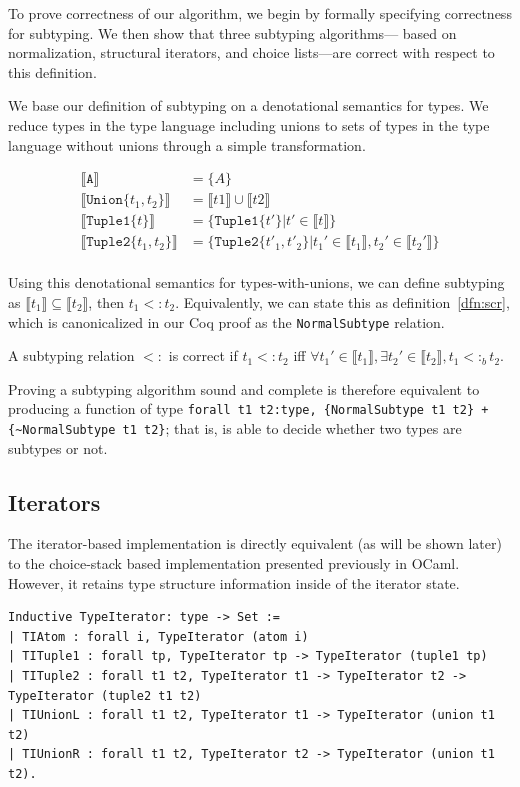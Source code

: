 \documentclass[a4paper,english]{lipics-v2018}
\newcommand{\xt}[1]{\texttt{#1}}
\newcommand{\tupleo}[1]{\xt{Tuple1\{}#1\xt{\}}}
\newcommand{\tuplet}[2]{\xt{Tuple2\{}#1,#2\xt{\}}}
\newcommand{\union}[2]{\xt{Union\{}#1,#2\xt{\}}}
\newcommand{\denotes}[1]{\llbracket #1 \rrbracket}
\newcommand{\bsub}{<:_b}
\begin{document}
To prove correctness of our algorithm, we begin by formally specifying
correctness for subtyping. We then show that three subtyping algorithms---
based on  normalization, structural iterators, and choice lists---are correct
with respect to this definition.

We base our definition of subtyping on a denotational semantics for types. 
We reduce types in the type language including unions to sets of types
in the type language without unions through a simple transformation. 

\begin{align*}
\denotes{\xt{A}} &= \{A\} \\
\denotes{\union{t_1}{t_2}} &= \denotes{t1} \cup \denotes{t2} \\
\denotes{\tupleo{t}} &= \{\tupleo{t'} | t' \in \denotes{t}\} \\
\denotes{\tuplet{t_1}{t_2}} &= \{\tuplet{t'_1}{t'_2} | t_1' \in \denotes{t_1},  t_2' \in \denotes{t_2'}\} \\
\end{align*}

Using this denotational semantics for types-with-unions, we can define
subtyping as $\denotes{t_1} \subseteq \denotes{t_2}$, then $t_1 <: t_2$.
Equivalently, we can state this as definition~\ref{dfn:scr}, which is canonicalized
in our Coq proof as the \verb|NormalSubtype| relation.

\begin{definition}
A subtyping relation $<:$ is correct if $t_1 <: t_2$ iff $\forall t_1' \in \denotes{t_1},
\exists t_2' \in \denotes{t_2}, t_1 \bsub t_2$.
\label{dfn:scr}
\end{definition}

Proving a subtyping algorithm sound and complete is therefore equivalent to
producing a function of type \verb|forall t1 t2:type, {NormalSubtype t1 t2} + {~NormalSubtype t1 t2}|; that is, is able to decide whether two types are
subtypes or not.

\subsection{Iterators}

The iterator-based implementation is directly equivalent (as will be shown
later) to the choice-stack based implementation presented previously in OCaml.
However, it retains type structure information inside of the iterator state.

\begin{verbatim}
Inductive TypeIterator: type -> Set :=
| TIAtom : forall i, TypeIterator (atom i)
| TITuple1 : forall tp, TypeIterator tp -> TypeIterator (tuple1 tp)
| TITuple2 : forall t1 t2, TypeIterator t1 -> TypeIterator t2 -> TypeIterator (tuple2 t1 t2)
| TIUnionL : forall t1 t2, TypeIterator t1 -> TypeIterator (union t1 t2)
| TIUnionR : forall t1 t2, TypeIterator t2 -> TypeIterator (union t1 t2).
\end{verbatim}
\end{document}
